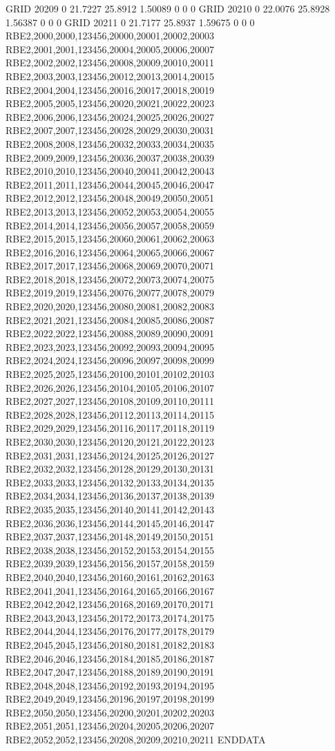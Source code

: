 GRID    20209   0       21.7227 25.8912 1.50089 0       0       0       
GRID    20210   0       22.0076 25.8928 1.56387 0       0       0       
GRID    20211   0       21.7177 25.8937 1.59675 0       0       0 
RBE2,2000,2000,123456,20000,20001,20002,20003
RBE2,2001,2001,123456,20004,20005,20006,20007
RBE2,2002,2002,123456,20008,20009,20010,20011
RBE2,2003,2003,123456,20012,20013,20014,20015
RBE2,2004,2004,123456,20016,20017,20018,20019
RBE2,2005,2005,123456,20020,20021,20022,20023
RBE2,2006,2006,123456,20024,20025,20026,20027
RBE2,2007,2007,123456,20028,20029,20030,20031
RBE2,2008,2008,123456,20032,20033,20034,20035
RBE2,2009,2009,123456,20036,20037,20038,20039
RBE2,2010,2010,123456,20040,20041,20042,20043
RBE2,2011,2011,123456,20044,20045,20046,20047
RBE2,2012,2012,123456,20048,20049,20050,20051
RBE2,2013,2013,123456,20052,20053,20054,20055
RBE2,2014,2014,123456,20056,20057,20058,20059
RBE2,2015,2015,123456,20060,20061,20062,20063
RBE2,2016,2016,123456,20064,20065,20066,20067
RBE2,2017,2017,123456,20068,20069,20070,20071
RBE2,2018,2018,123456,20072,20073,20074,20075
RBE2,2019,2019,123456,20076,20077,20078,20079
RBE2,2020,2020,123456,20080,20081,20082,20083
RBE2,2021,2021,123456,20084,20085,20086,20087
RBE2,2022,2022,123456,20088,20089,20090,20091
RBE2,2023,2023,123456,20092,20093,20094,20095
RBE2,2024,2024,123456,20096,20097,20098,20099
RBE2,2025,2025,123456,20100,20101,20102,20103
RBE2,2026,2026,123456,20104,20105,20106,20107
RBE2,2027,2027,123456,20108,20109,20110,20111
RBE2,2028,2028,123456,20112,20113,20114,20115
RBE2,2029,2029,123456,20116,20117,20118,20119
RBE2,2030,2030,123456,20120,20121,20122,20123
RBE2,2031,2031,123456,20124,20125,20126,20127
RBE2,2032,2032,123456,20128,20129,20130,20131
RBE2,2033,2033,123456,20132,20133,20134,20135
RBE2,2034,2034,123456,20136,20137,20138,20139
RBE2,2035,2035,123456,20140,20141,20142,20143
RBE2,2036,2036,123456,20144,20145,20146,20147
RBE2,2037,2037,123456,20148,20149,20150,20151
RBE2,2038,2038,123456,20152,20153,20154,20155
RBE2,2039,2039,123456,20156,20157,20158,20159
RBE2,2040,2040,123456,20160,20161,20162,20163
RBE2,2041,2041,123456,20164,20165,20166,20167
RBE2,2042,2042,123456,20168,20169,20170,20171
RBE2,2043,2043,123456,20172,20173,20174,20175
RBE2,2044,2044,123456,20176,20177,20178,20179
RBE2,2045,2045,123456,20180,20181,20182,20183
RBE2,2046,2046,123456,20184,20185,20186,20187
RBE2,2047,2047,123456,20188,20189,20190,20191
RBE2,2048,2048,123456,20192,20193,20194,20195
RBE2,2049,2049,123456,20196,20197,20198,20199
RBE2,2050,2050,123456,20200,20201,20202,20203
RBE2,2051,2051,123456,20204,20205,20206,20207
RBE2,2052,2052,123456,20208,20209,20210,20211
ENDDATA